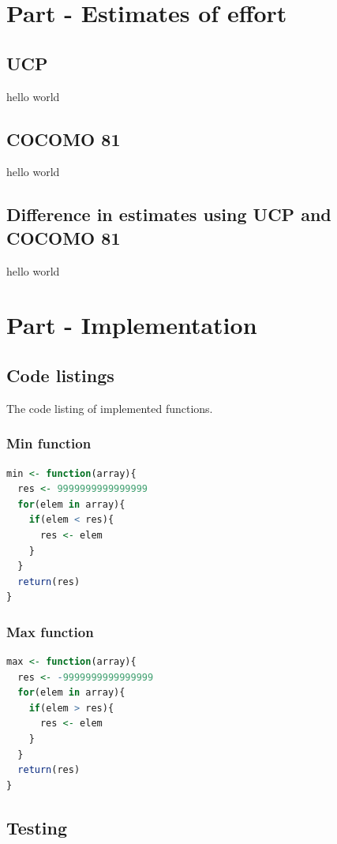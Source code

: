 \documentclass[12pt]{article}
\begin{document}
\section{Part - Estimates of effort}
\subsection{UCP}
hello world
\subsection{COCOMO 81}
hello world
\subsection{Difference in estimates using UCP and COCOMO 81}
hello world
\section{Part - Implementation}
\subsection{Code listings}
The code listing of implemented functions.
\subsubsection{Min function}

\begin{lstlisting}[language=R]
min <- function(array){
  res <- 9999999999999999
  for(elem in array){
    if(elem < res){
      res <- elem
    }
  }
  return(res)
}
\end{lstlisting}

\subsubsection{Max function}

\begin{lstlisting}[language=R]
max <- function(array){
  res <- -9999999999999999
  for(elem in array){
    if(elem > res){
      res <- elem
    }
  }
  return(res)
}
\end{lstlisting}
\subsection{Testing}
\end{document}
